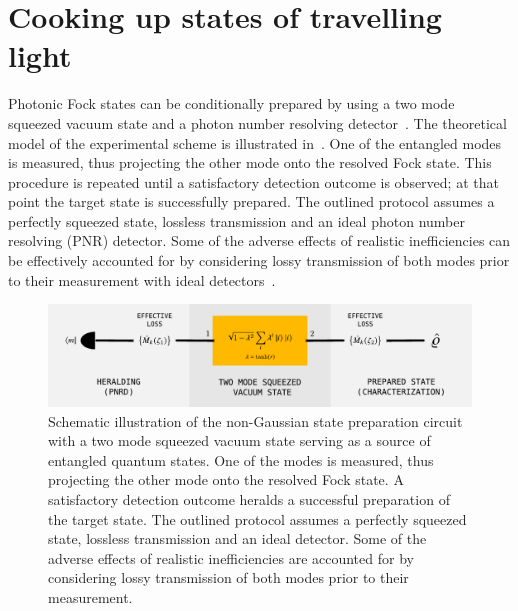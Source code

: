 \documentclass{article}
\begin{document}
%
%

\section{Cooking up states of travelling light}

Photonic Fock states can be conditionally prepared by using a two mode squeezed vacuum state and a photon number resolving detector~\cite{yukawa2013a,yoshikawa2018,tiedau2019,provaznik2020}. The theoretical model of the experimental scheme is illustrated in~. One of the entangled modes is measured, thus projecting the other mode onto the resolved Fock state. This procedure is repeated until a satisfactory detection outcome is observed; at that point the target state is successfully prepared. The outlined protocol assumes a perfectly squeezed state, lossless transmission and an ideal photon number resolving (PNR) detector. Some of the adverse effects of realistic inefficiencies can be effectively accounted for by considering lossy transmission of both modes prior to their measurement with ideal detectors~\cite{feito2009}.

\begin{figure}[h]
  \begin{center}
    \includegraphics[width = 1.00 \columnwidth]{import/illustrate_scheme_alt.pdf}
  \end{center}
  \caption{
    Schematic illustration of the non-Gaussian state preparation circuit with a two mode squeezed vacuum state serving as a source of entangled quantum states. One of the modes is measured, thus projecting the other mode onto the resolved Fock state. A satisfactory detection outcome heralds a successful preparation of the target state. The outlined protocol assumes a perfectly squeezed state, lossless transmission and an ideal detector. Some of the adverse effects of realistic inefficiencies are accounted for by considering lossy transmission of both modes prior to their measurement.
  }
  \label{f-scheme}
\end{figure}
\end{document}
